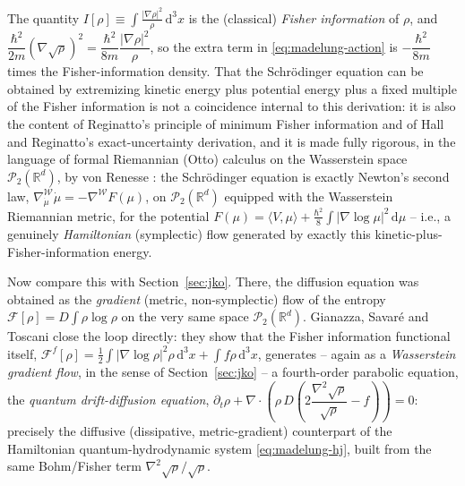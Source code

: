 \documentclass[11pt]{article}
\newcommand{\rd}{\mathrm{d}}
\newcommand{\lap}{\nabla^2}
\begin{document}
The quantity $I[\rho] \equiv \displaystyle\int \frac{|\nabla\rho|^2}{\rho}\,\rd^3x$ is the (classical) \emph{Fisher information} of $\rho$, and $\dfrac{\hbar^2}{2m}(\nabla\sqrt\rho)^2 = \dfrac{\hbar^2}{8m}\dfrac{|\nabla\rho|^2}{\rho}$, so the extra term in \eqref{eq:madelung-action} is $-\dfrac{\hbar^2}{8m}$ times the Fisher-information density. That the Schr\"odinger equation can be obtained by extremizing kinetic energy plus potential energy plus a fixed multiple of the Fisher information is not a coincidence internal to this derivation: it is also the content of Reginatto's principle of minimum Fisher information \cite{Reginatto1998} and of Hall and Reginatto's exact-uncertainty derivation, and it is made fully rigorous, in the language of formal Riemannian (Otto) calculus on the Wasserstein space $\mathcal P_2(\mathbb R^d)$, by von Renesse \cite{vonRenesse2012}: the Schr\"odinger equation is exactly Newton's second law, $\nabla^{\mathcal W}_{\dot\mu}\dot\mu = -\nabla^{\mathcal W}F(\mu)$, on $\mathcal P_2(\mathbb R^d)$ equipped with the Wasserstein Riemannian metric, for the potential $F(\mu) = \langle V,\mu\rangle + \frac{\hbar^2}{8}\int|\nabla\log\mu|^2\,\rd\mu$ -- i.e., a genuinely \emph{Hamiltonian} (symplectic) flow generated by exactly this kinetic-plus-Fisher-information energy.

Now compare this with Section~\ref{sec:jko}. There, the diffusion equation was obtained as the \emph{gradient} (metric, non-symplectic) flow of the entropy $\mathcal F[\rho]=D\int\rho\log\rho$ on the very same space $\mathcal P_2(\mathbb R^d)$. Gianazza, Savar\'e and Toscani \cite{GianazzaSavareToscani2009} close the loop directly: they show that the Fisher information functional itself, $\mathcal F^f[\rho] = \tfrac12\int|\nabla\log\rho|^2\rho\,\rd^3x + \int f\rho\,\rd^3x$, generates -- again as a \emph{Wasserstein gradient flow}, in the sense of Section~\ref{sec:jko} -- a fourth-order parabolic equation, the \emph{quantum drift-diffusion equation}, $\partial_t \rho + \nabla\cdot\!\left(\rho\, D\!\left(2\dfrac{\lap\sqrt\rho}{\sqrt\rho} - f\right)\right) = 0$: precisely the diffusive (dissipative, metric-gradient) counterpart of the Hamiltonian quantum-hydrodynamic system \eqref{eq:madelung-hj}, built from the same Bohm/Fisher term $\lap\sqrt\rho/\sqrt\rho$.
\end{document}

